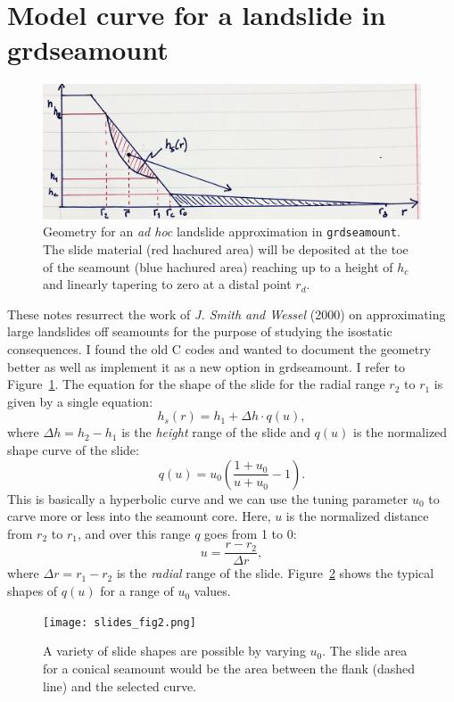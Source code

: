 \documentclass[12pt,letterpaper,margin=0.5in]{report}
\begin{document}
\section{Model curve for a landslide in grdseamount}

\begin{figure}[h!]
  \centering
  \includegraphics[width=\textwidth]{slides_fig1.png}
  \caption{Geometry for an \emph{ad hoc} landslide approximation in \texttt{grdseamount}.  The slide material (red hachured area)
  will be deposited at the toe of the seamount (blue hachured area) reaching up to a height of $h_c$ and linearly
  tapering to zero at a distal point $r_d$.}
  \label{slides_fig1}
\end{figure}

These notes resurrect the work of {\it J. Smith and Wessel} (2000) on approximating large landslides off seamounts
for the purpose of studying the isostatic consequences.  I found the old C codes and wanted to document the geometry
better as well as implement it as a new option in grdseamount.  I refer to Figure~\ref{slides_fig1}.  The equation for the
shape of the slide for the radial range $r_2$ to $r_1$ is given by a single equation:
\begin{equation}
h_s(r) = h_1 + \Delta h \cdot q(u),
\end{equation}
where $\Delta h = h_2 - h_1$ is the \emph{height} range of the slide and $q(u)$ is the normalized shape curve of the slide:
\begin{equation}
q(u) = u_0 \left (\frac{1 + u_0}{u + u_0} - 1 \right ).
\end{equation}
This is basically a hyperbolic curve and we can use the tuning parameter $u_0$ to carve more or less into the seamount core.
Here, $u$ is the normalized distance from $r_2$ to $r_1$, and over this range $q$ goes from 1 to 0:
\begin{equation}
u = \frac{r-r_2}{\Delta r},
\end{equation}
where $\Delta r = r_1 - r_2$ is the \emph{radial} range of the slide.
Figure~\ref{slides_fig2} shows the typical shapes of $q(u)$ for a range of $u_0$ values.
\begin{figure}[h!]
  \centering
  \texttt{[image: slides\_fig2.png]}
  \caption{A variety of slide shapes are possible by varying $u_0$.  The slide area for a conical seamount would be the area
  between the flank (dashed line) and the selected curve.}
  \label{slides_fig2}
\end{figure}
\end{document}
